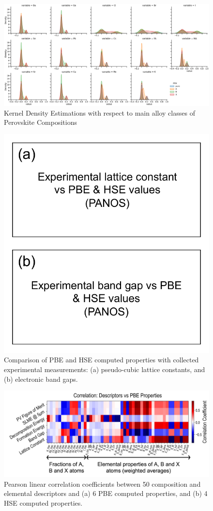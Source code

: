 \documentclass[twoside,twocolumn,9pt]{article}
\begin{document}
\begin{figure}[h]
  \centering
  \includegraphics[width=0.80\linewidth]{./composition_kde.png}
  \caption{\label{fig:kdes}
    Kernel Density Estimations with respect to main alloy classes of
    Perovskite Compositions
  }
\end{figure}


\begin{figure}[h]
  \centering
  \includegraphics[width=0.80\linewidth]{Figure3.pdf}
  \caption{\label{Fig:outline} 
    Comparison of PBE and HSE computed properties with collected
    experimental measurements: (a) pseudo-cubic lattice constants, and
    (b) electronic band gaps.
  }
\end{figure}


\begin{figure}[h]
  \centering
  \includegraphics[width=0.99\linewidth]{Figure4.png}
  \caption{\label{Fig:outline} 
    Pearson linear correlation coefficients between 50 composition and
    elemental descriptors and (a) 6 PBE computed properties, and (b) 4
    HSE computed properties.
  }
\end{figure}
\end{document}
